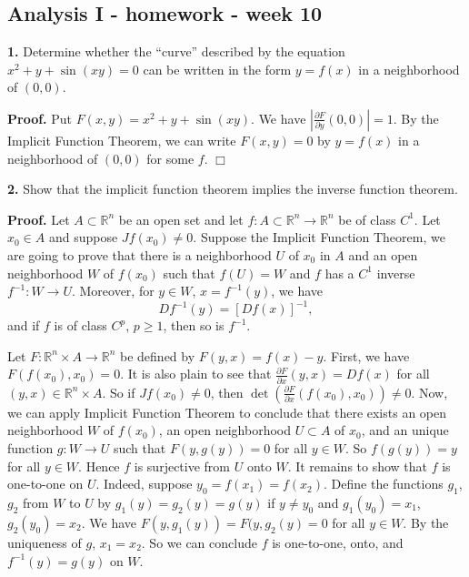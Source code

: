 \documentclass{article}
\begin{document}
    
    
    
    
    

    
    \subsection*{Analysis I - homework - week
10}\label{analysis-i---homework---week-10}

    \textbf{1.} Determine whether the ``curve'' described by the equation
$x^2 + y + \sin(xy) = 0$ can be written in the form $y = f (x)$ in a
neighborhood of $(0, 0)$.

    \textbf{Proof.} Put $F(x,y) = x^2 + y + \sin(xy)$. We have
$\left|\frac{\partial F}{\partial y} (0,0)\right| = 1$. By the Implicit
Function Theorem, we can write $F(x,y) = 0$ by $y = f(x)$ in a
neighborhood of $(0,0)$ for some $f$. $\Box$

    \textbf{2.} Show that the implicit function theorem implies the inverse
function theorem.

    \textbf{Proof.} Let $A \subset \mathbb{R}^n$ be an open set and let
$f: A\subset \mathbb{R}^n \to \mathbb{R}^n$ be of class $C^1$. Let
$x_0\in A$ and suppose $Jf(x_0) \ne 0$. Suppose the Implicit Function
Theorem, we are going to prove that there is a neighborhood $U$ of $x_0$
in $A$ and an open neighborhood $W$ of $f(x_0)$ such that $f(U) = W$ and
$f$ has a $C^1$ inverse $f^{-1}: W \to U$. Moreover, for $y \in W$,
$x = f^{-1}(y)$, we have \[Df^{-1}(y) = [Df(x)]^{-1},\] and if $f$ is of
class $C^{p}$, $p \ge 1$, then so is $f^{-1}$.

Let $F: \mathbb{R}^n \times A \to \mathbb{R}^n$ be defined by
$F(y,x) = f(x) - y$. First, we have $F(f(x_0),x_0) = 0$. It is also
plain to see that $\frac{\partial F}{\partial x}(y,x) = Df (x)$ for all
$(y,x) \in \mathbb{R}^n \times A$. So if $Jf(x_0) \ne 0$, then
$\det \left(\frac{\partial F}{\partial x}(f(x_0),x_0)\right) \ne 0$.
Now, we can apply Implicit Function Theorem to conclude that there
exists an open neighborhood $W$ of $f(x_0)$, an open neighborhood
$U\subset A$ of $x_0$, and an unique function $g:W \to U$ such that
$F(y,g(y)) = 0$ for all $y \in W$. So $f(g(y)) = y$ for all $y \in W$.
Hence $f$ is surjective from $U$ onto $W$. It remains to show that $f$
is one-to-one on $U$. Indeed, suppose $y_0 = f(x_1) = f(x_2)$. Define
the functions $g_1$, $g_2$ from $W$ to $U$ by $g_1(y) = g_2(y) = g(y)$
if $y\ne y_0$ and $g_1(y_0) = x_1$, $g_2(y_0) = x_2$. We have
$F(y,g_1(y)) = F(y,g_2(y) = 0$ for all $y \in W$. By the uniqueness of
$g$, $x_1 = x_2$. So we can conclude $f$ is one-to-one, onto, and
$f^{-1}(y) = g(y)$ on $W$.
\end{document}
